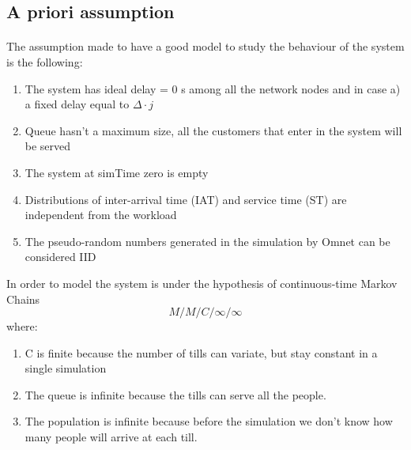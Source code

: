 \subsection{A priori assumption}
\paragraph{} 
The assumption made to have a good model to study the behaviour of the system is the following:
\begin{enumerate}
	\item The system has ideal  delay = 0 s among all the network nodes and in case a) a fixed delay equal to $\Delta \cdot j$
	\item Queue hasn't a maximum size, all the customers that enter in the system will be served
	\item The system at simTime zero is empty
	\item Distributions of inter-arrival time (IAT) and service time (ST) are independent from the workload
	\item The pseudo-random numbers generated in the simulation by Omnet can be considered IID
\end{enumerate}
In order to model the system is  under the hypothesis of continuous-time Markov Chains \[M/M/C/\infty/\infty\] where:
\begin{enumerate}
	\item C is finite because the number of tills can variate, but stay constant in a single simulation
	\item The queue is infinite because the tills can serve all the people.
	\item The population is infinite because before the simulation we don’t know how many people will arrive at each till.
\end{enumerate}
